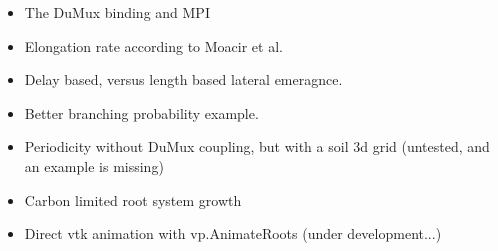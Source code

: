 \begin{itemize}

\item The DuMux binding and MPI

\item Elongation rate according to Moacir et al.

\item Delay based, versus length based lateral emeragnce.

\item Better branching probability example.

\item Periodicity without DuMux coupling, but with a soil 3d grid (untested, and an example is missing)

\item Carbon limited root system growth

\item Direct vtk animation with vp.AnimateRoots (under development...)

\end{itemize}

